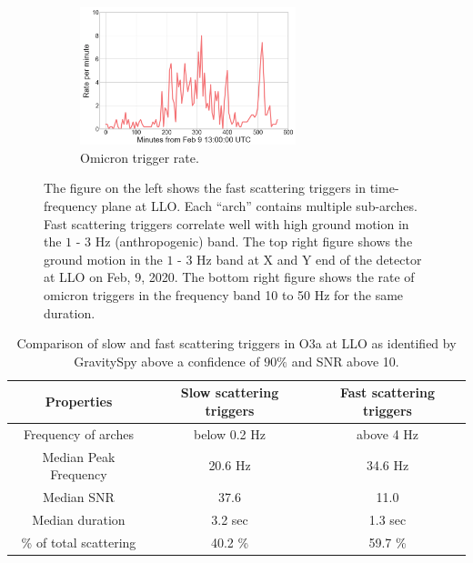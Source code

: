 \documentclass[12pt]{iopart}
\begin{document}
\begin{figure}
\begin{minipage}{0.5\textwidth}
    \vspace*{0.6cm}
    \begin{subfigure}{\textwidth}
    \includegraphics[width=\textwidth,height=4cm]{fast_glitchrate1.png}
    \caption{Omicron trigger rate.} \label{subfig:fast_scat_rate}
    \end{subfigure}
    \end{minipage}
    \caption{The figure on the left shows the fast scattering triggers in time-frequency plane at LLO. Each ``arch'' contains multiple sub-arches. Fast scattering triggers correlate well with high ground motion in the $1$ - $3$ Hz (anthropogenic) band. The top right figure shows the ground motion in the $1$ - $3$ Hz band at X and Y end of the detector at LLO on Feb, 9, 2020. The bottom right figure shows the rate of omicron triggers in the frequency band 10 to 50 Hz for the same duration. }
    \label{fig:Fast_scattering}

\end{figure}

\begin{table}[h]
    \centering
    \begin{tabular}{c|c|c}
    \hline
      \textbf{Properties}   &  \textbf{Slow scattering triggers} & 
      \textbf{Fast scattering triggers}\\
      \hline
       Frequency of arches  & below 0.2 Hz & above 4 Hz \\
      \hline
      Median Peak Frequency & 20.6 Hz & 34.6 Hz \\
      \hline
      Median SNR & 37.6 & 11.0 \\
      \hline
      Median duration & 3.2 sec & 1.3 sec \\
      \hline
      \% of total scattering & 40.2 \% & 59.7 \% \\
       
    \hline
    \end{tabular}
    \caption{Comparison of slow and fast scattering triggers in O3a at LLO as identified by GravitySpy above a confidence of $90 \%$ and SNR above 10. }
    \label{tab:fastslowtab}
\end{table}{}
\end{document}
